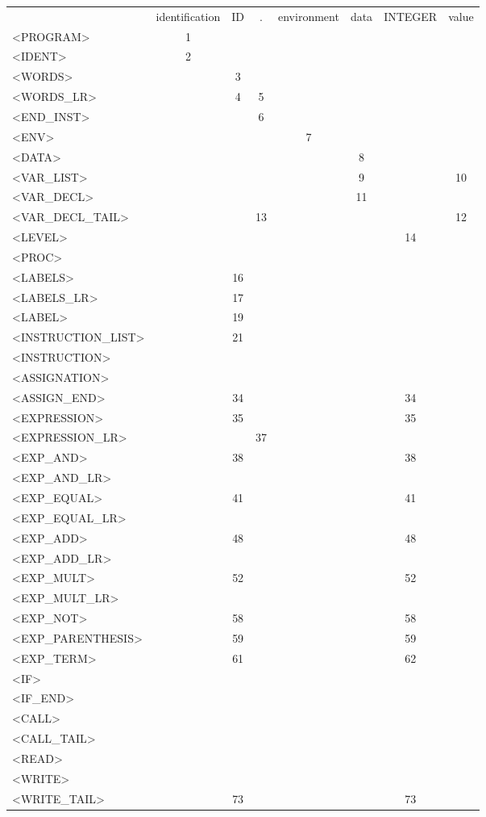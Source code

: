\documentclass[a4paper,11pt]{article}
\begin{document}
\newpage
\begin{longtable}{l||ccccccc}
	& identification & ID & . & environment & data & INTEGER & value\\
	<PROGRAM> & 1 & & & & & & \\
	<IDENT> & 2 & & & & & & \\
	<WORDS> &  & 3 & & & & & \\
	<WORDS\_LR> & & 4 & 5 & & & & \\
	<END\_INST> & & & 6 & & & & \\
	<ENV> & & & & 7 & & & \\
	<DATA> & & & & & 8 & & \\
	<VAR\_LIST> & & & & & 9 & & 10 \\
	<VAR\_DECL> & & & & & 11 & & \\
	<VAR\_DECL\_TAIL> & & & 13 & & & & 12 \\
	<LEVEL> & & & & & & 14 & \\
	<PROC> & & & & & & & \\
	<LABELS> & & 16 & & & & & \\
	<LABELS\_LR> & & 17 & & & & & \\
	<LABEL> & & 19 & & & & & \\
	<INSTRUCTION\_LIST> & & 21 & & & & & \\
	<INSTRUCTION> & & & & & & & \\
	<ASSIGNATION> & & & & & & & \\
	<ASSIGN\_END> & & 34 & & & & 34 & \\
	<EXPRESSION> & & 35 & & & & 35 & \\
	<EXPRESSION\_LR> & & & 37 & & & & \\
	<EXP\_AND> & & 38 & & & & 38 & \\
	<EXP\_AND\_LR> & & & & & & & \\
	<EXP\_EQUAL> & & 41 & & & & 41 & \\
	<EXP\_EQUAL\_LR> & & & & & & & \\
	<EXP\_ADD> & & 48 & & & & 48 & \\
	<EXP\_ADD\_LR> & & & & & & & \\
	<EXP\_MULT> & & 52 & & & & 52 & \\
	<EXP\_MULT\_LR> & & & & & & & \\
	<EXP\_NOT> & & 58 & & & & 58 & \\
	<EXP\_PARENTHESIS> & & 59 & & & & 59 & \\
	<EXP\_TERM> & & 61 & & & & 62 & \\
	<IF> & & & & & & & \\
	<IF\_END> & & & & & & & \\
	<CALL> & & & & & & & \\
	<CALL\_TAIL> & & & & & & & \\
	<READ> & & & & & & & \\
	<WRITE> & & & & & & & \\
	<WRITE\_TAIL> & & 73 & & & & 73 & \\
\end{longtable}
\end{document}

